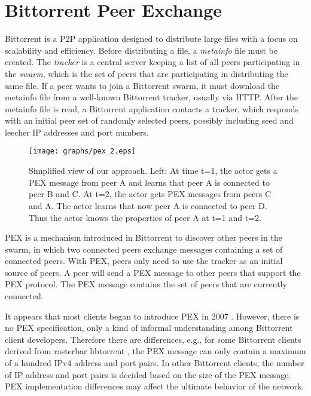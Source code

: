 \documentclass[paper]{ieice}
\begin{document}
\section{Bittorrent Peer Exchange}\label{background}
Bittorrent is a P2P application designed to distribute large files with a focus on scalability and efficiency.  
Before distributing a file, a \textit{metainfo} file must be created.  
The \textit{tracker} is a central server keeping a list of all peers participating in the \textit{swarm}, which is the set of peers that are participating in distributing the same file.  
If a peer wants to join a Bittorrent swarm, it must download the metainfo file from a well-known Bittorrent tracker, usually via HTTP. 
After the metainfo file is read, a Bittorrent application contacts a tracker, which responds with an initial peer set of randomly selected peers, possibly including seed and leecher IP addresses and port numbers.  

\begin{figure}[tb]
\begin{center}
\texttt{[image: graphs/pex\_2.eps]}
\end{center}
\caption{Simplified view of our approach. Left: At time t=1, the actor gets a PEX message from peer A and
learns that peer A is connected to peer B and C. At t=2, the actor gets  PEX messages from peers C and A. The actor
learns that now peer A is connected to peer D. Thus the actor knows the properties of peer A at t=1 and t=2.} 
\label{fig:pexworks}
\vspace{-2mm}
\end{figure}

PEX is a mechanism introduced in Bittorrent to discover other peers in the swarm, in which two connected peers exchange messages containing a set of connected peers.  
With PEX, peers only need to use the tracker as an initial source of peers.   
A peer will send a PEX message to other peers that support the PEX protocol. 
The PEX message contains the set of peers that are currently connected.

It appears that most clients began to introduce PEX in 2007  \cite{client}. 
However, there is no PEX specification, only a kind of informal understanding among Bittorrent client developers.
Therefore there are differences, e.g., for some Bittorrent clients derived from rasterbar libtorrent \cite{rasterbar}, the PEX message can only contain a maximum of a hundred IPv4 address and port pairs. 
In other Bittorrent clients, the number of IP address and port pairs is decided based on the size of the PEX message.  
PEX implementation differences may affect the ultimate behavior of the network.
\end{document}
